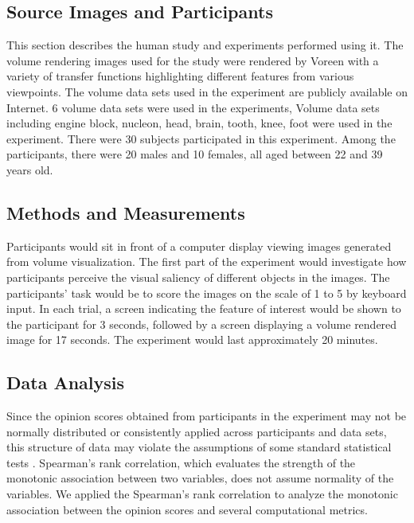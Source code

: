 \subsection{Source Images and Participants}
This section describes the human study and experiments performed using it.
The volume rendering images used for the study were rendered by Voreen \cite{meyer-spradow_voreen:_2009} with a variety of transfer functions highlighting different features from various viewpoints. The volume data sets used in the experiment are publicly available on Internet.
6 volume data sets were used in the experiments, 
Volume data sets including engine block, nucleon, head, brain, tooth, knee, foot \cite{website:Roettger_volume_2013} \cite{website:Voreen_datasets_2013} were used in the experiment.
There were 30 subjects participated in this experiment. Among the participants, there were 20 males and 10 females, all aged between 22 and 39 years old.

\subsection{Methods and Measurements}
Participants would sit in front of a computer display viewing images generated from volume visualization. The first part of the experiment would investigate how participants perceive the visual saliency of different objects in the images. The participants' task would be to score the images on the scale of 1 to 5 by keyboard input. 
In each trial, a screen indicating the feature of interest would be shown to the participant for 3 seconds, followed by a screen displaying a volume rendered image for 17 seconds.
The experiment would last approximately 20 minutes.

\subsection{Data Analysis}
Since the opinion scores obtained from participants in the experiment may not be normally distributed or consistently applied across participants and data sets, this structure of data may violate the assumptions of some standard statistical tests \cite{cunningham_experimental_2011}.
Spearman's rank correlation, which evaluates the strength of the monotonic association between two variables, does not assume normality of the variables.
We applied the Spearman's rank correlation to analyze the monotonic association between the opinion scores and several computational metrics.

